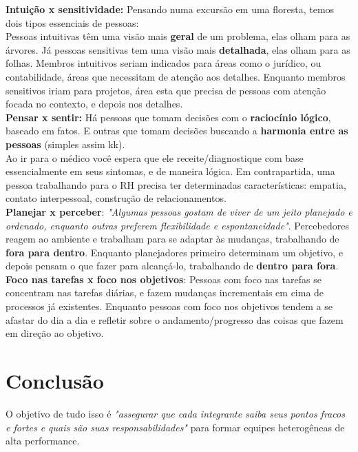 \documentclass[a4paper, 12pt]{article}
\begin{document}
\textbf{Intuição x sensitividade:} Pensando numa excursão em uma floresta, temos dois tipos essenciais de pessoas:\\

Pessoas intuitivas têm uma visão mais \textbf{geral} de um problema, elas olham para as árvores.
Já pessoas sensitivas tem uma visão mais \textbf{detalhada}, elas olham para as folhas.
Membros intuitivos seriam indicados para áreas como o jurídico, ou contabilidade, áreas que necessitam de atenção aos detalhes.
Enquanto membros sensitivos iriam para projetos, área esta que precisa de pessoas com atenção focada no contexto, e depois nos detalhes.\\

\textbf{Pensar x sentir:} Há pessoas que tomam decisões com o \textbf{raciocínio lógico}, baseado em fatos. E outras que tomam decisões buscando a \textbf{harmonia entre as pessoas}
(simples assim kk).\\

Ao ir para o médico você espera que ele receite/diagnostique com base essencialmente em seus sintomas, e de maneira lógica.
Em contrapartida, uma pessoa trabalhando para o RH precisa ter determinadas características: empatia, contato interpessoal, construção de relacionamentos.\\

\textbf{Planejar x perceber}: \textit{"Algumas pessoas gostam de viver de um jeito planejado e ordenado, enquanto outras preferem flexibilidade e espontaneidade"}. Percebedores reagem ao ambiente e trabalham para se adaptar às mudanças, trabalhando de \textbf{fora para dentro}. Enquanto planejadores primeiro determinam um objetivo, e depois pensam o que fazer para alcançá-lo, trabalhando de \textbf{dentro para fora}.\\

\textbf{Foco nas tarefas x foco nos objetivos}: Pessoas com foco nas tarefas se concentram nas tarefas diárias, e fazem mudanças incrementais em cima de processos já existentes. Enquanto pessoas com foco nos objetivos tendem a se afastar do dia a dia e refletir sobre o andamento/progresso das coisas que fazem em direção ao objetivo.

\section{Conclusão}
O objetivo de tudo isso é \textit{"assegurar que cada integrante saiba seus pontos fracos e fortes e quais são suas responsabilidades"} para formar equipes heterogêneas de alta performance.\\
\end{document}
